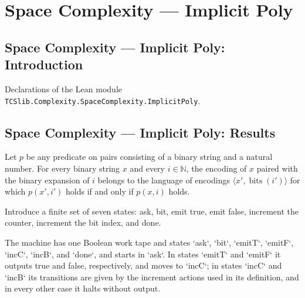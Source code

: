 \section{Space Complexity --- Implicit Poly}
\subsection*{Space Complexity --- Implicit Poly: Introduction}

Declarations of the Lean module \texttt{TCSlib.Complexity.SpaceComplexity.ImplicitPoly}.

\subsection*{Space Complexity --- Implicit Poly: Results}

\begin{lemma}
\label{Complexity.pairEncode_mem_indexLang}
\leanok
{}
Let $p$ be any predicate on pairs consisting of a binary string and a natural number.
For every binary string $x$ and every $i\in\mathbb{N}$, the encoding of $x$ paired with
the binary expansion of $i$ belongs to the language of encodings $\langle
x',\operatorname{bits}(i')\rangle$ for which $p(x',i')$ holds if and only if $p(x,i)$
holds.
\end{lemma}

\begin{definition}
\label{Complexity.ImplicitEnum.St}
\leanok
Introduce a finite set of seven states: ask, bit, emit true, emit false, increment the
counter, increment the bit index, and done.
\end{definition}

\begin{definition}
\label{Complexity.ImplicitEnum.tm}
\leanok
{}
The machine has one Boolean work tape and states `ask`, `bit`, `emitT`, `emitF`, `incC`,
`incB`, and `done`, and starts in `ask`. In states `emitT` and `emitF` it outputs true
and false, respectively, and moves to `incC`; in states `incC` and `incB` its
transitions are given by the increment actions used in its definition, and in every
other case it halts without output.
\end{definition}

